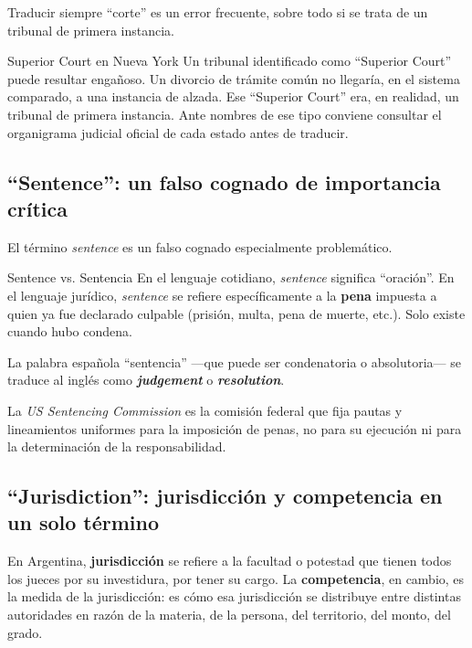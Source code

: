 \documentclass[12pt,oneside]{book}
\begin{document}
Traducir siempre ``corte'' es un error frecuente, sobre todo si se trata de un tribunal de primera instancia.

\begin{example}{Superior Court en Nueva York}
Un tribunal identificado como ``Superior Court'' puede resultar engañoso. Un divorcio de trámite común no llegaría, en el sistema comparado, a una instancia de alzada. Ese ``Superior Court'' era, en realidad, un tribunal de primera instancia. Ante nombres de ese tipo conviene consultar el organigrama judicial oficial de cada estado antes de traducir.
\end{example}

\subsection{``Sentence'': un falso cognado de importancia crítica}

El término \textit{sentence} es un falso cognado especialmente problemático.

\begin{definition}{Sentence vs. Sentencia}
En el lenguaje cotidiano, \textit{sentence} significa ``oración''. En el lenguaje jurídico, \textit{sentence} se refiere específicamente a la \textbf{pena} impuesta a quien ya fue declarado culpable (prisión, multa, pena de muerte, etc.). Solo existe cuando hubo condena.

La palabra española ``sentencia'' ---que puede ser condenatoria o absolutoria--- se traduce al inglés como \textbf{\textit{judgement}} o \textbf{\textit{resolution}}.
\end{definition}

La \textit{US Sentencing Commission} es la comisión federal que fija pautas y lineamientos uniformes para la imposición de penas, no para su ejecución ni para la determinación de la responsabilidad.

\subsection{``Jurisdiction'': jurisdicción y competencia en un solo término}

En Argentina, \textbf{jurisdicción} se refiere a la facultad o potestad que tienen todos los jueces por su investidura, por tener su cargo. La \textbf{competencia}, en cambio, es la medida de la jurisdicción: es cómo esa jurisdicción se distribuye entre distintas autoridades en razón de la materia, de la persona, del territorio, del monto, del grado.
\end{document}
